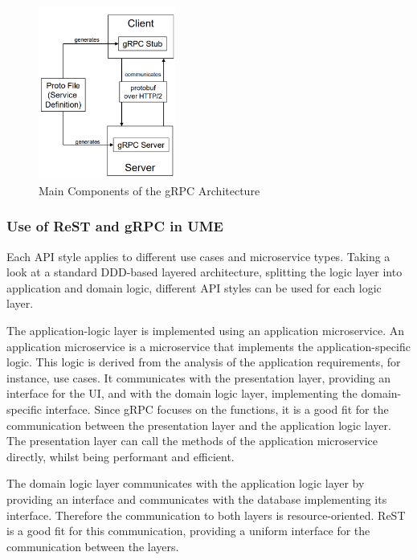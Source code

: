 \begin{figure}
    \centering
    \includegraphics[width=0.4\textwidth]{figures/microservices/microservices_grpcMainComponents.png}
    \caption{Main Components of the gRPC Architecture}
    \label{fig:grpc_main_components}
\end{figure}

\subsubsection*{Use of ReST and gRPC in UME}
Each API style applies to different use cases and microservice types.
Taking a look at a standard DDD-based layered architecture, splitting the logic layer into application and domain logic, different API styles can be used for each logic layer.

The application-logic layer is implemented using an application microservice.
An application microservice is a microservice that implements the application-specific logic.
This logic is derived from the analysis of the application requirements, for instance, use cases.
It communicates with the presentation layer, providing an interface for the UI, and with the domain logic layer, implementing the domain-specific interface.
Since gRPC focuses on the functions, it is a good fit for the communication between the presentation layer and the application logic layer.
The presentation layer can call the methods of the application microservice directly, whilst being performant and efficient.

The domain logic layer communicates with the application logic layer by providing an interface and communicates with the database implementing its interface.
Therefore the communication to both layers is resource-oriented.
ReST is a good fit for this communication, providing a uniform interface for the communication between the layers.

